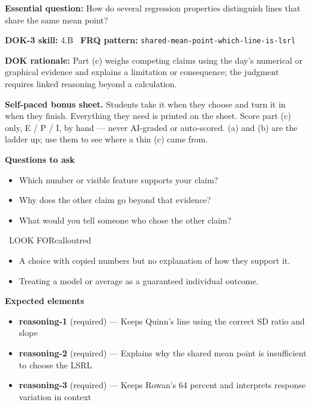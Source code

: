 \documentclass[11pt]{article}
\begin{document}
\textbf{Essential question:} How do several regression properties distinguish lines that share the same mean point?\par
\textbf{DOK-3 skill:} 4.B \textperiodcentered\ \textbf{FRQ pattern:} {\small\texttt{shared-\allowbreak{}mean-\allowbreak{}point-\allowbreak{}which-\allowbreak{}line-\allowbreak{}is-\allowbreak{}lsrl}}\par
\textbf{DOK rationale:} Part (c) weighs competing claims using the day's numerical or graphical evidence and explains a limitation or consequence; the judgment requires linked reasoning beyond a calculation.\par

\textbf{Self-paced bonus sheet.} Students take it when they choose and turn it in when they finish. Everything they need is printed on the sheet. Score part (c) only, E / P / I, by hand --- never AI-graded or auto-scored. (a) and (b) are the ladder up; use them to see where a thin (c) came from.\par

\textbf{Questions to ask}
\begin{itemize}[leftmargin=1.5em,itemsep=2pt,topsep=2pt]
  \item Which number or visible feature supports your claim?
  \item Why does the other claim go beyond that evidence?
  \item What would you tell someone who chose the other claim?
\end{itemize}

\begin{callout}{\IconWarn\ LOOK FOR}{calloutred}
\begin{itemize}[leftmargin=1.5em,itemsep=2pt,topsep=2pt]
  \item A choice with copied numbers but no explanation of how they support it.
  \item Treating a model or average as a guaranteed individual outcome.
\end{itemize}
\end{callout}


\textbf{Expected elements}
\begin{itemize}[leftmargin=1.5em,itemsep=2pt,topsep=2pt]
  \item \textbf{reasoning-1} (required) --- Keeps Quinn's line using the correct SD ratio and slope
  \item \textbf{reasoning-2} (required) --- Explains why the shared mean point is insufficient to choose the LSRL
  \item \textbf{reasoning-3} (required) --- Keeps Rowan's 64 percent and interprets response variation in context
\end{itemize}
\end{document}
